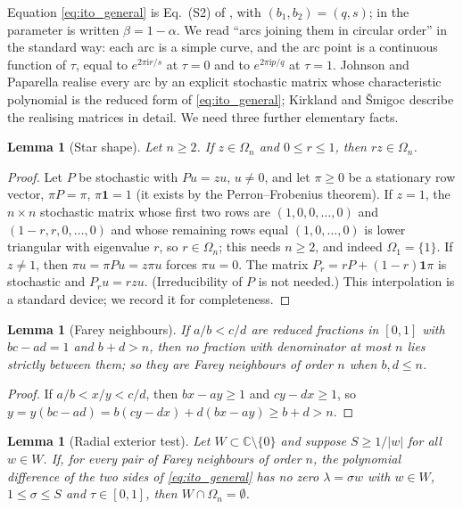 \documentclass[11pt,a4paper]{article}
\numberwithin{equation}{section}
\newtheorem{lemma}[theorem]{Lemma}
\theoremstyle{definition}
\theoremstyle{remark}
\newcommand{\ii}{\mathrm{i}}
\newcommand{\one}{\mathbf{1}}
\newcommand{\Om}{\Omega}
\begin{document}
Equation \eqref{eq:ito_general} is Eq.~(S2) of \cite{xu2025}, with
\((b_1,b_2)=(q,s)\); in \cite{johnson2017} the parameter is written
\(\beta=1-\alpha\). We read ``arcs joining them in circular order'' in
the standard way: each arc is a simple curve, and the arc point is a
continuous function of \(\tau\), equal to \(e^{2\pi\ii r/s}\) at
\(\tau=0\) and to \(e^{2\pi\ii p/q}\) at \(\tau=1\). Johnson and
Paparella \cite[Theorem~3.2]{johnson2017} realise every arc by an
explicit stochastic matrix whose characteristic polynomial is the
reduced form of \eqref{eq:ito_general}; Kirkland and \v{S}migoc
\cite{kirkland2022} describe the realising matrices in detail. We need
three further elementary facts.

\begin{lemma}[Star shape]
\label{lem:star}
Let \(n\ge2\). If \(z\in\Om_n\) and \(0\le r\le1\), then \(rz\in\Om_n\).
\end{lemma}

\begin{proof}
Let \(P\) be stochastic with \(Pu=zu\), \(u\ne0\), and let \(\pi\ge0\)
be a stationary row vector, \(\pi P=\pi\), \(\pi\one=1\) (it exists by
the Perron--Frobenius theorem). If \(z=1\), the \(n\times n\)
stochastic matrix whose first two rows are \((1,0,0,\ldots,0)\) and
\((1-r,r,0,\ldots,0)\) and whose remaining rows equal
\((1,0,\ldots,0)\) is lower triangular with eigenvalue \(r\), so
\(r\in\Om_n\); this needs \(n\ge2\), and indeed \(\Om_1=\{1\}\). If \(z\ne1\), then \(\pi u=\pi Pu=z\pi u\) forces \(\pi u=0\).
The matrix \(P_r=rP+(1-r)\one\pi\) is stochastic and
\(P_ru=rzu\). (Irreducibility of \(P\) is not needed.) This
interpolation is a standard device; we record it for completeness.
\end{proof}

\begin{lemma}[Farey neighbours]
\label{lem:farey}
If \(a/b<c/d\) are reduced fractions in \([0,1]\) with \(bc-ad=1\) and
\(b+d>n\), then no fraction with denominator at most \(n\) lies strictly
between them; so they are Farey neighbours of order \(n\) when
\(b,d\le n\).
\end{lemma}

\begin{proof}
If \(a/b<x/y<c/d\), then \(bx-ay\ge1\) and \(cy-dx\ge1\), so
\(y=y(bc-ad)=b(cy-dx)+d(bx-ay)\ge b+d>n\).
\end{proof}

\begin{lemma}[Radial exterior test]
\label{lem:exterior_test}
Let \(W\subset\mathbb C\setminus\{0\}\) and suppose \(S\ge1/|w|\) for
all \(w\in W\). If, for every pair of Farey neighbours of order \(n\),
the polynomial difference of the two sides of \eqref{eq:ito_general}
has no zero \(\lambda=\sigma w\) with \(w\in W\), \(1\le\sigma\le S\)
and \(\tau\in[0,1]\), then \(W\cap\Om_n=\emptyset\).
\end{lemma}
\end{document}
